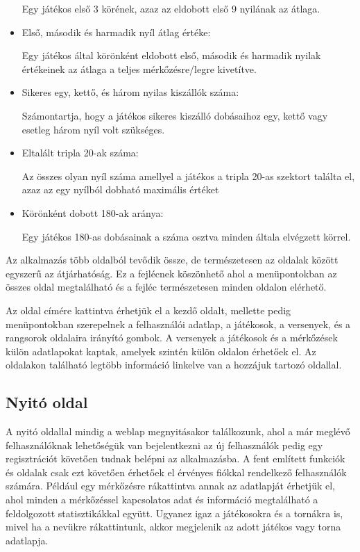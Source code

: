 \begin{itemize}
Egy játékos első 3 körének, azaz az eldobott első 9 nyilának az átlaga.
\item Első, második és harmadik nyíl átlag értéke:

Egy játékos által körönként eldobott első, második és harmadik nyilak értékeinek az átlaga a teljes mérkőzésre/legre kivetítve.
\item Sikeres egy, kettő, és három nyilas kiszállók száma:

Számontartja, hogy a játékos sikeres kiszálló dobásaihoz egy, kettő vagy esetleg három nyíl volt szükséges.
\item Eltalált tripla 20-ak száma:

Az összes olyan nyíl száma amellyel a játékos a tripla 20-as szektort találta el, azaz az egy nyílból dobható maximális értéket

\item Körönként dobott 180-ak aránya:

Egy játékos 180-as dobásainak a száma osztva minden általa elvégzett körrel.

\end{itemize}

Az alkalmazás több oldalból tevődik össze, de természetesen az oldalak között egyszerű az átjárhatóság. Ez a fejlécnek köszönhető ahol a menüpontokban az összes oldal megtalálható és a fejléc természetesen minden oldalon elérhető.

Az oldal címére kattintva érhetjük el a kezdő oldalt, mellette pedig menüpontokban szerepelnek a felhasználói adatlap, a játékosok, a versenyek, és a rangsorok oldalaira irányító gombok. A versenyek a játékosok és a mérkőzések külön adatlapokat kaptak, amelyek szintén külön oldalon érhetőek el.
Az oldalakon található legtöbb információ linkelve van a hozzájuk tartozó oldallal.

\subsection{Nyitó oldal}
A nyitó oldallal mindig a weblap megnyitásakor találkozunk, ahol a már meglévő felhasználóknak lehetőségük van bejelentkezni az új felhasználók pedig egy regisztrációt követően tudnak belépni az alkalmazásba. A fent említett funkciók és oldalak csak ezt követően érhetőek el érvényes fiókkal rendelkező felhasználók számára.
Például egy mérkőzésre rákattintva annak az adatlapját érhetjük el, ahol minden a mérkőzéssel kapcsolatos adat és információ megtalálható a feldolgozott statisztikákkal együtt. Ugyanez igaz a játékosokra és a tornákra is, mivel ha a nevükre rákattintunk, akkor megjelenik az adott játékos vagy torna adatlapja.

